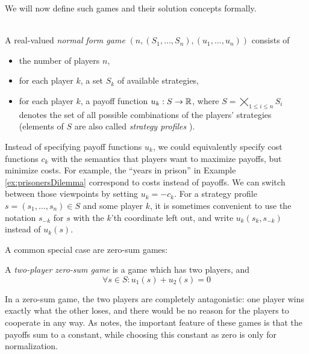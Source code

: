 \documentclass[a4paper]{scrreprt}
\begin{document}
    We will now define such games and their solution concepts formally.

    \begin{defn}~\\
        A real-valued \emph{normal form game} $(n, (S_1, \dots, S_n), (u_1, \dots, u_n))$ consists of 
        \begin{itemize}
            \item the number of players $n$,
            \item for each player $k$, a set $S_k$ of available strategies,
            \item for each player $k$, a payoff function $u_k: S \to \mathbb{R}$, where $S = \bigtimes\limits_{1\leq i \leq n} S_i$ denotes the set of all possible combinations of the players' strategies (elements of $S$ are also called \emph{strategy profiles} \cite{bib:fudenbergGameTheory}). 
        \end{itemize}
        \label{defn:realValuedGames}
    \end{defn}
    
    Instead of specifying payoff functions $u_k$, we could equivalently specify cost functions $c_k$ with the semantics that players want to maximize payoffs, but minimize costs. For example, the “years in prison” in Example \ref{ex:prisonersDilemma} correspond to costs instead of payoffs. We can switch between those viewpoints by setting $u_k = - c_k$. For a strategy profile $s = (s_1, \dots, s_n) \in S$ and some player $k$, it is sometimes convenient to use the notation $s_{-k}$ for $s$ with the $k$'th coordinate left out, and write $u_k(s_k, s_{-k})$ instead of $u_k(s)$. \cite{bib:nisanAlgorithmicGameTheoryCh1Basic}
    
    A common special case are zero-sum games:
    
    \begin{defn}
        A \emph{two-player zero-sum game} is a game which has two players, and 
        \[ \forall s \in S: u_1(s) + u_2(s) = 0 \]
    \end{defn}

    In a zero-sum game, the two players are completely antagonistic: %
    one player wins exactly what the other loses, and there would be no reason for the players to cooperate in any way. As \cite{bib:fudenbergGameTheory} notes, the important feature of these games is that the payoffs sum to a constant, while choosing this constant as zero is only for normalization.
    
\end{document}
